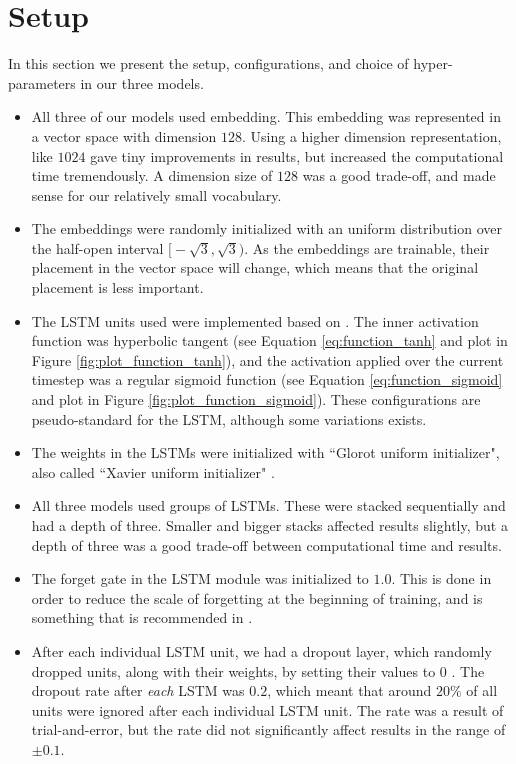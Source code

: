 
\section{Setup}
In this section we present the setup, configurations, and choice of hyper-parameters in our three models. 

\begin{itemize}
    \item All three of our models used embedding. This embedding was represented in a vector space with dimension \(128\). Using a higher dimension representation, like \(1024\) gave tiny improvements in results, but increased the computational time tremendously. A dimension size of \(128\) was a good trade-off, and made sense for our relatively small vocabulary.
    \item The embeddings were randomly initialized with an uniform distribution over the half-open interval \(\big[-\sqrt{3}, \sqrt{3}\big)\). As the embeddings are trainable, their placement in the vector space will change, which means that the original placement is less important.
    \item The LSTM units used were implemented based on \citep{hochreiter1997long}. The inner activation function was hyperbolic tangent (see Equation \ref{eq:function_tanh} and plot in Figure \ref{fig:plot_function_tanh}), and the activation applied over the current timestep was a regular sigmoid function (see Equation \ref{eq:function_sigmoid} and plot in Figure \ref{fig:plot_function_sigmoid}). These configurations are pseudo-standard for the LSTM, although some variations exists.
    \item The weights in the LSTMs were initialized with ``Glorot uniform initializer", also called ``Xavier uniform initializer" \citep{glorot2010understanding}.
    \item All three models used groups of LSTMs. These were stacked sequentially and had a depth of three. Smaller and bigger stacks affected results slightly, but a depth of three was a good trade-off between computational time and results.
    \item The forget gate in the LSTM module was initialized to \(1.0\). This is done in order to reduce the scale of forgetting at the beginning of training, and is something that is recommended in \citep{zaremba2015empirical}.
    \item After each individual LSTM unit, we had a dropout layer, which randomly dropped units, along with their weights, by setting their values to \(0\) \citep{srivastava2014dropout}. The dropout rate after \emph{each} LSTM was \(0.2\), which meant that around \(20\%\) of all units were ignored after each individual LSTM unit. The rate was a result of trial-and-error, but the rate did not significantly affect results in the range of \(\pm 0.1\).
\end{itemize}

